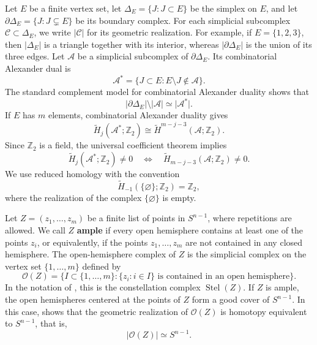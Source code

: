\documentclass[12pt,reqno]{amsart}
\numberwithin{equation}{section}
\theoremstyle{remark}
\begin{document}
Let \(E\) be a finite vertex set, let
\(\Delta_E=\{J:J\subset E\}\) be the simplex on \(E\), and let
\(\partial\Delta_E=\{J:J\subsetneq E\}\) be its boundary complex.
For each simplicial subcomplex \(\mathcal C\subset\Delta_E\), we write
\(\lvert\mathcal C\rvert\) for its geometric realization.
For example, if \(E=\{1,2,3\}\), then \(\lvert\Delta_E\rvert\) is a
triangle together with its interior, whereas
\(\lvert\partial\Delta_E\rvert\) is the union of its three edges.
Let \(\mathcal A\) be a simplicial subcomplex of
\(\partial\Delta_E\). Its combinatorial Alexander dual is
\begin{equation}\label{eq:combinatorial-Alexander-dual}
 \mathcal A^*=\{J\subset E:E\setminus J\notin\mathcal A\}.
\end{equation}
The standard complement model for combinatorial Alexander duality
\cite[Introduction]{BjornerTancer} shows that
\begin{equation}\label{eq:Alexander-complement-model}
	\lvert\partial\Delta_E\rvert
	\setminus
	\lvert\mathcal A\rvert
	\simeq
	\lvert\mathcal A^*\rvert.
\end{equation}
 If \(E\) has \(m\) elements, combinatorial Alexander duality \cite[Theorem~1.1]{BjornerTancer} gives
\begin{equation}
 \widetilde H_j(\mathcal A^*;\mathbb Z_2)
 \cong
 \widetilde H^{m-j-3}(\mathcal A;\mathbb Z_2).
\end{equation}
Since $\mathbb Z_2$ is a field, the universal coefficient theorem implies
\begin{equation}\label{eq:Alexander-nonvanishing}
 \widetilde H_j(\mathcal A^*;\mathbb Z_2)\neq0
 \quad\Longleftrightarrow\quad
 \widetilde H_{m-j-3}(\mathcal A;\mathbb Z_2)\neq0.
\end{equation}
We use reduced homology with the convention
\begin{equation}\label{eq:minus-one-homology}
 \widetilde H_{-1}(\{\varnothing\};\mathbb Z_2)=\mathbb Z_2,
\end{equation}
where the realization of the complex $\{\varnothing\}$ is empty.

Let \(Z=(z_1,\ldots,z_m)\) be a finite list of points in \(S^{n-1}\),
where repetitions are allowed. We call \(Z\) \textbf{ample} if every open
hemisphere contains at least one of the points \(z_i\), or equivalently, if
the points \(z_1,\ldots,z_m\) are not contained in any closed
hemisphere. The
open-hemisphere complex of \(Z\) is the simplicial complex on the
vertex set \(\{1,\ldots,m\}\) defined by
\begin{equation}
 \mathcal O(Z)
 =\{I\subset\{1,\ldots,m\}:\{z_i:i\in I\}\text{ is contained  in an open hemisphere}\}.
\end{equation}
In the notation of \cite{AyzenbergBeketovMagai}, this is the
constellation complex \(\operatorname{Stel}(Z)\).
If \(Z\) is ample, the open hemispheres centered at the points of
\(Z\) form a good cover of \(S^{n-1}\). In this case,
\cite[Theorem~1]{AyzenbergBeketovMagai} shows that the geometric
realization of \(\mathcal O(Z)\) is homotopy equivalent to
\(S^{n-1}\), that is,
\begin{equation}\label{eq:open-hemisphere-homotopy}
	\lvert\mathcal O(Z)\rvert\simeq S^{n-1}.
\end{equation}
\end{document}
